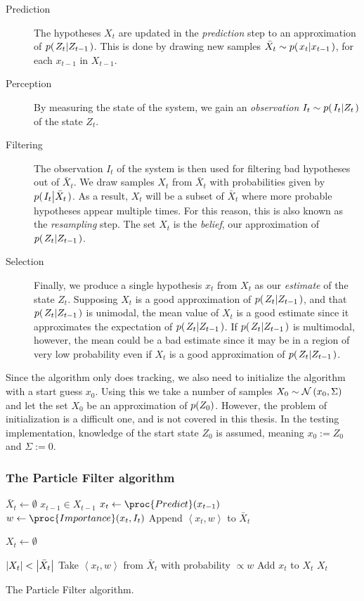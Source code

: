 \begin{description}
\item[Prediction] The hypotheses $X_t$ are updated in the \emph{prediction} step to an approximation of $p{(\left. Z_t \middle\vert Z_{t-1} \right.)}$. This is done by drawing new samples $\bar{X}_t \sim p{(\left. x_t \middle\vert x_{t-1} \right.)}$, for each $x_{t-1}$ in $X_{t-1}$.
\item[Perception] By measuring the state of the system, we gain an \emph{observation} $I_t \sim p{(\left. I_t \middle\vert Z_t \right.)}$ of the state $Z_t$.
\item[Filtering] The observation $I_t$ of the system is then used for filtering bad hypotheses out of $\bar{X}_t$. We draw samples $X_t$ from $\bar{X}_t$ with probabilities given by $p{(\left. I_t \middle\vert \bar{X}_t \right.)}$. As a result, $X_t$ will be a subset of $\bar{X}_t$ where more probable hypotheses appear multiple times. For this reason, this is also known as the \emph{resampling} step. The set $X_t$ is the \emph{belief}, our approximation of $p{(\left. Z_t \middle\vert Z_{t-1} \right.)}$.
\item[Selection] Finally, we produce a single hypothesis $x_t$ from $X_t$ as our \emph{estimate} of the state $Z_t$. Supposing $X_t$ is a good approximation of $p{(\left. Z_t \middle\vert Z_{t-1} \right.)}$, and that $p{(\left. Z_t \middle\vert Z_{t-1} \right.)}$ is unimodal, the mean value of $X_t$ is a good estimate since it approximates the expectation of $p{(\left. Z_t \middle\vert Z_{t-1} \right.)}$. If $p{(\left. Z_t \middle\vert Z_{t-1} \right.)}$ is multimodal, however, the mean could be a bad estimate since it may be in a region of very low probability even if $X_t$ is a good approximation of $p{(\left. Z_t \middle\vert Z_{t-1} \right.)}$.
\end{description}

Since the algorithm only does tracking, we also need to initialize the algorithm with a start guess $x_0$. Using this we take a number of samples $X_0 \sim \mathcal{N}\left(x_0, \Sigma\right)$ and let the set $X_0$ be an approximation of $p{(Z_0)}$. However, the problem of initialization is a difficult one\cite{Hedvig}, and is not covered in this thesis. In the testing implementation, knowledge of the start state $Z_0$ is assumed, meaning $x_0 := Z_0$ and $\Sigma := 0$.



\subsubsection{The Particle Filter algorithm}
\begin{table}
  \begin{codebox}
    \li $\bar{X}_t \gets \emptyset$
    \li \ForEach $x_{t-1} \in X_{t-1}$
    \li \Do
    \li $x_t \gets \proc{Predict}(x_{t-1})$
    \li $w \gets \proc{Importance}(x_t,I_t)$
    \li Append $\left<x_t, w\right>$ to $\bar{X}_t$
    \End
    \li
    
    \li $X_t \gets \emptyset$
    
    \li \While $\left\vert X_t \right\vert < \left\vert \bar{X}_t \right\vert$
    \li \Do
    \li Take $\left<x_t, w\right>$ from $\bar{X}_t$ with probability $\propto w$
    \li Add $x_t$ to $X_t$
    \End
    \li \Return $X_t$
  \end{codebox}
  \caption{The Particle Filter algorithm.}
  \label{pf-algorithm}
\end{table}

